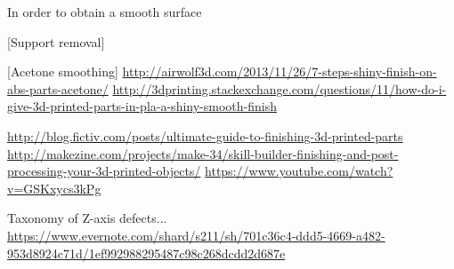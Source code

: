 In order to obtain a smooth surface 

[Support removal] 

[Acetone smoothing]
\url{http://airwolf3d.com/2013/11/26/7-steps-shiny-finish-on-abs-parts-acetone/}
\url{http://3dprinting.stackexchange.com/questions/11/how-do-i-give-3d-printed-parts-in-pla-a-shiny-smooth-finish}

\url{http://blog.fictiv.com/posts/ultimate-guide-to-finishing-3d-printed-parts}
\url{http://makezine.com/projects/make-34/skill-builder-finishing-and-post-processing-your-3d-printed-objects/}
\url{https://www.youtube.com/watch?v=GSKxycs3kPg}

Taxonomy of Z-axis defects... 
\url{https://www.evernote.com/shard/s211/sh/701c36c4-ddd5-4669-a482-953d8924c71d/1ef992988295487c98c268dcdd2d687e}



